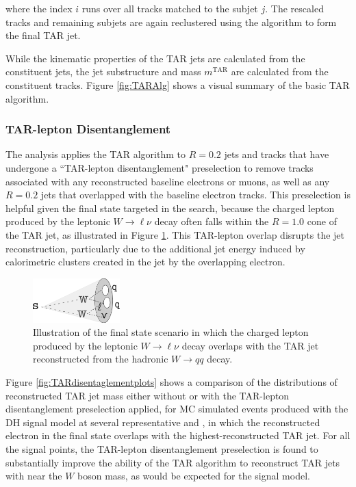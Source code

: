 \noindent where the index \(i\) runs over all tracks matched to the subjet \(j\). The rescaled tracks and remaining subjets are again reclustered using the \akt algorithm to form the final \largeR TAR jet.

While the kinematic properties of the TAR jets are calculated from the constituent \smallR jets, the jet substructure and mass \(m^\text{TAR}\) are calculated from the constituent tracks. Figure \ref{fig:TARAlg} shows a visual summary of the basic TAR algorithm. 

\subsubsection{TAR-lepton Disentanglement}

The analysis applies the TAR algorithm to \(R=0.2\) \smallR jets and tracks that have undergone a ``TAR-lepton disentanglement" preselection to remove tracks associated with any reconstructed baseline electrons or muons, as well as any \(R=0.2\) jets that overlapped with the baseline electron tracks. This preselection is helpful given the final state targeted in the search, because the charged lepton produced by the leptonic \(W\rightarrow \ell\nu\) decay often falls within the \(R=1.0\) cone of the TAR jet, as illustrated in Figure \ref{fig:TAR_lepton_overlap_illustration}. This TAR-lepton overlap disrupts the jet reconstruction, particularly due to the additional jet energy induced by calorimetric clusters created in the \largeR jet by the overlapping electron.

\begin{figure}[H]
  \centering
     \includegraphics[width = 0.3\textwidth]{Figures/5/lepton_overlap.pdf}
     \caption{Illustration of the final state scenario in which the charged lepton produced by the leptonic \(W\rightarrow \ell\nu\) decay overlaps with the \largeR TAR jet reconstructed from the hadronic \(W\rightarrow qq\) decay.}
     \label{fig:TAR_lepton_overlap_illustration}
  \end{figure}
  
Figure \ref{fig:TARdisentaglementplots} shows a comparison of the distributions of reconstructed TAR jet mass \mTAR either without or with the TAR-lepton disentanglement preselection applied, for MC simulated events produced with the DH signal model at several representative \ms and \mZp, in which the reconstructed electron in the final state overlaps with the highest-\pt reconstructed TAR jet. For all the signal points, the TAR-lepton disentanglement preselection is found to substantially improve the ability of the TAR algorithm to reconstruct TAR jets with \mTAR near the \(W\) boson mass, as would be expected for the signal model.
  
